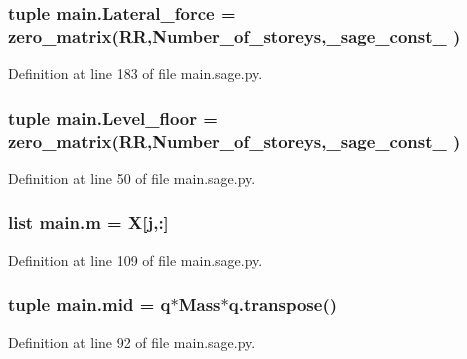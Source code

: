 \subsubsection[{Lateral\+\_\+force}]{\setlength{\rightskip}{0pt plus 5cm}tuple main.\+Lateral\+\_\+force = zero\+\_\+matrix(R\+R,Number\+\_\+of\+\_\+storeys,\+\_\+sage\+\_\+const\+\_ )}\label{namespacemain_a712447a841ce148ad2d1210e57dc7894}


Definition at line 183 of file main.\+sage.\+py.

\hypertarget{namespacemain_ad7b051da0e829aff37fef1e171e37fa3}{}
\subsubsection[{Level\+\_\+floor}]{\setlength{\rightskip}{0pt plus 5cm}tuple main.\+Level\+\_\+floor = zero\+\_\+matrix(R\+R,Number\+\_\+of\+\_\+storeys,\+\_\+sage\+\_\+const\+\_ )}\label{namespacemain_ad7b051da0e829aff37fef1e171e37fa3}


Definition at line 50 of file main.\+sage.\+py.

\hypertarget{namespacemain_af6e3698b7f50fc004eb759d7c447fdb3}{}
\subsubsection[{m}]{\setlength{\rightskip}{0pt plus 5cm}list main.\+m = {\bf X}\mbox{[}{\bf j},\+:\mbox{]}}\label{namespacemain_af6e3698b7f50fc004eb759d7c447fdb3}


Definition at line 109 of file main.\+sage.\+py.

\hypertarget{namespacemain_a70551c7fc78da8fdec83fe500056d388}{}
\subsubsection[{mid}]{\setlength{\rightskip}{0pt plus 5cm}tuple main.\+mid = {\bf q}$\ast$Mass$\ast$q.\+transpose()}\label{namespacemain_a70551c7fc78da8fdec83fe500056d388}


Definition at line 92 of file main.\+sage.\+py.

\hypertarget{namespacemain_ab273c2ae46514d6ec3d905c30cbb5a1b}{}
